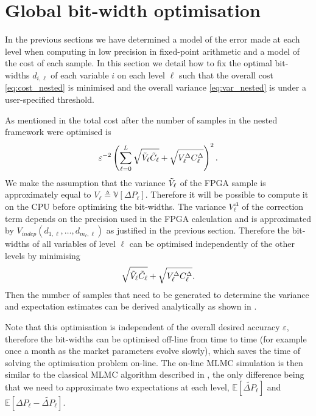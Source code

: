 \section{Global bit-width optimisation} \label{sec:optimisation}
In the previous sections we have determined a model of the error made at each level when computing in low precision in fixed-point arithmetic 
and a model of the cost of each sample.
In this section we detail how to fix the optimal bit-widths $d_{i,\ell}$ of each variable $i$ on each level $\ell$ such that the overall cost \eqref{eq:cost_nested} is minimised and the overall variance \eqref{eq:var_nested} is under a user-specified threshold.

As mentioned in  the total cost after the number of samples in the nested framework were optimised is 
\begin{equation}
\varepsilon^{-2}
    \left(\sum_{\ell=0}^L \sqrt{\Tilde{V}_\ell \Tilde{C}_\ell}+ \sqrt{V^{\Delta}_\ell C^{\Delta}_\ell} \right)^2.
\end{equation}
We make the assumption that the variance $\Tilde{V}_\ell$ of the FPGA sample 
is approximately equal to $V_\ell \triangleq \mathbb{V}[\Delta P_\ell]$. Therefore it will be possible to compute it on the CPU before optimising the bit-widths. The variance $V^{\Delta}_\ell$ of the correction term depends on the precision used in the FPGA calculation and is approximated by $V_{indep}(d_{1,\ell}, \ldots, d_{m_\ell,\ell})$ as justified in the previous section.
Therefore the bit-widths of all variables of level $\ell$ can be optimised independently of the other levels by minimising %
\begin{equation} \label{eq:level_cost}
    \sqrt{\Tilde{V}_\ell \Tilde{C}_\ell}+ \sqrt{V^{\Delta}_\ell C^{\Delta}_\ell}.
\end{equation}
Then the number of samples that need to be generated to determine the variance and expectation estimates can be derived analytically as shown in .

Note that this optimisation is independent of the overall desired accuracy $\varepsilon$, therefore the bit-widths can be optimised off-line from time to time (for example once a month as the market parameters evolve slowly), which saves the time of solving the optimisation problem on-line. The on-line MLMC simulation is then similar to the classical MLMC algorithm described in \cite{GILES2008}, the only difference being that we need to approximate two expectations at each level, $\mathbb{E}[\widetilde{\Delta P}_\ell]$ and $\mathbb{E}[\Delta P_\ell - \widetilde{\Delta P}_\ell]$.


